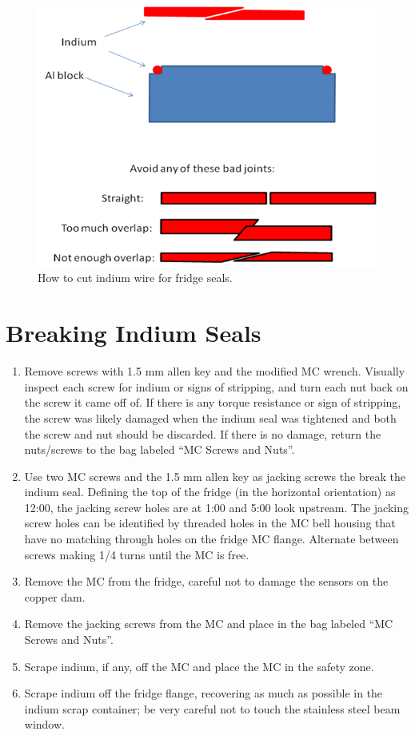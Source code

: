 \begin{figure}
 \centering
 \includegraphics[scale=0.5]{./img/indium-cut.png}
 \caption{How to cut indium wire for fridge seals. \cite{zhaoindium}}
 \label{fig:indium-cut}
\end{figure}



\section{Breaking Indium Seals}
\begin{enumerate}
 \item Remove screws with 1.5 mm allen key and the modified MC wrench.  Visually inspect each screw for indium or signs of stripping, and turn each nut back on the screw it came off of.  If there is any torque resistance or sign of stripping, the screw was likely damaged when the indium seal was tightened and both the screw and nut should be discarded.  If there is no damage, return the nuts/screws to the bag labeled ``MC Screws and Nuts''.
\item Use two MC screws and the 1.5 mm allen key as jacking screws the break the indium seal.  Defining the top of the fridge (in the horizontal orientation) as 12:00, the jacking screw holes are at 1:00 and 5:00 look upstream.  The jacking screw holes can be identified by threaded holes in the MC bell housing that have no matching through holes on the fridge MC flange.  Alternate between screws making 1/4 turns until the MC is free.
\item Remove the MC from the fridge, careful not to damage the sensors on the copper dam.
\item Remove the jacking screws from the MC and place in the bag labeled ``MC Screws and Nuts''.
\item Scrape indium, if any, off the MC and place the MC in the safety zone.
\item Scrape indium off the fridge flange, recovering as much as possible in the indium scrap container; be very careful not to touch the stainless steel beam window.
\end{enumerate}


